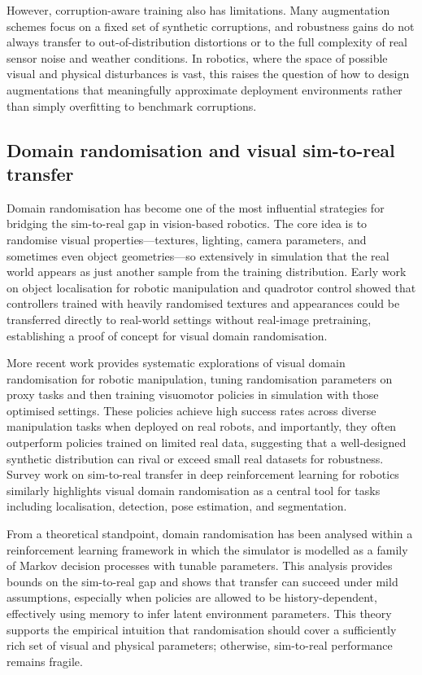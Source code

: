 \documentclass[11pt,a4paper]{article}
\begin{document}
However, corruption-aware training also has limitations. Many augmentation schemes focus on a fixed set of synthetic corruptions, and robustness gains do not always transfer to out-of-distribution distortions or to the full complexity of real sensor noise and weather conditions. In robotics, where the space of possible visual and physical disturbances is vast, this raises the question of how to design augmentations that meaningfully approximate deployment environments rather than simply overfitting to benchmark corruptions.

\subsection{Domain randomisation and visual sim-to-real transfer}
Domain randomisation has become one of the most influential strategies for bridging the sim-to-real gap in vision-based robotics. The core idea is to randomise visual properties---textures, lighting, camera parameters, and sometimes even object geometries---so extensively in simulation that the real world appears as just another sample from the training distribution. Early work on object localisation for robotic manipulation and quadrotor control showed that controllers trained with heavily randomised textures and appearances could be transferred directly to real-world settings without real-image pretraining, establishing a proof of concept for visual domain randomisation.

More recent work provides systematic explorations of visual domain randomisation for robotic manipulation, tuning randomisation parameters on proxy tasks and then training visuomotor policies in simulation with those optimised settings. These policies achieve high success rates across diverse manipulation tasks when deployed on real robots, and importantly, they often outperform policies trained on limited real data, suggesting that a well-designed synthetic distribution can rival or exceed small real datasets for robustness. Survey work on sim-to-real transfer in deep reinforcement learning for robotics similarly highlights visual domain randomisation as a central tool for tasks including localisation, detection, pose estimation, and segmentation.

From a theoretical standpoint, domain randomisation has been analysed within a reinforcement learning framework in which the simulator is modelled as a family of Markov decision processes with tunable parameters. This analysis provides bounds on the sim-to-real gap and shows that transfer can succeed under mild assumptions, especially when policies are allowed to be history-dependent, effectively using memory to infer latent environment parameters. This theory supports the empirical intuition that randomisation should cover a sufficiently rich set of visual and physical parameters; otherwise, sim-to-real performance remains fragile.
\end{document}
